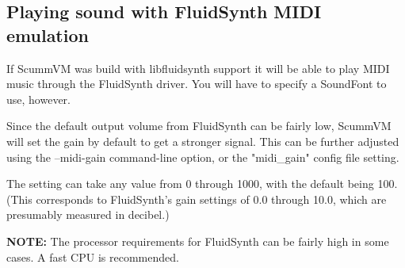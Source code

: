 


\subsection{Playing sound with FluidSynth MIDI emulation}

If ScummVM was build with libfluidsynth support it will be able to play MIDI
music through the FluidSynth driver. You will have to specify a SoundFont to
use, however.

Since the default output volume from FluidSynth can be fairly low, ScummVM will
set the gain by default to get a stronger signal. This can be further adjusted
using the --midi-gain command-line option, or the "midi\_gain" config file
setting.

The setting can take any value from 0 through 1000, with the default being 100.
(This corresponds to FluidSynth's gain settings of 0.0 through 10.0, which are
presumably measured in decibel.)

\textbf{NOTE:} The processor requirements for FluidSynth can be fairly high in
some cases. A fast CPU is recommended.
